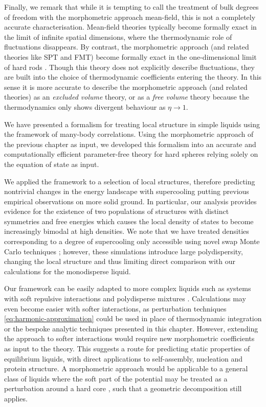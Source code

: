 \documentclass[11pt,twoside]{report}
\begin{document}
Finally, we remark that while it is tempting to call the treatment of bulk degrees of freedom with the morphometric approach mean-field, this is not a completely accurate characterisation.
Mean-field theories typically become formally exact in the limit of infinite spatial dimensions, where the thermodynamic role of fluctuations disappears.
By contrast, the morphometric approach (and related theories like SPT and FMT) become formally exact in the one-dimensional limit of hard rods%
.
Though this theory does not explicitly describe fluctuations, they are built into the choice of thermodynamic coefficients entering the theory.
In this sense it is more accurate to describe the morphometric approach (and related theories) as an \emph{excluded volume} theory, or as a \emph{free volume} theory because the thermodynamics only shows divergent behaviour as $\eta \to 1$.

We have presented a formalism for treating local structure in simple liquids using the framework of many-body correlations.
Using the morphometric approach of the previous chapter as input, we developed this formalism into an accurate and computationally efficient parameter-free theory for hard spheres relying solely on the equation of state as input.

We applied the framework to a selection of local structures, therefore predicting nontrivial changes in the energy landscape with supercooling putting previous empirical observations on more solid ground.
In particular, our analysis provides evidence for the existence of two populations of structures with distinct symmetries and free energies which causes the local density of states to become increasingly bimodal at high densities.
We note that we have treated densities corresponding to a degree of supercooling only accessible using novel swap Monte Carlo techniques \cite{BerthierPRL2016}; however, these simulations introduce large polydispersity, changing the local structure \cite{CoslovichJPCM2018} and thus limiting direct comparison with our calculations for the monodisperse liquid.

Our framework can be easily adapted to more complex liquids such as systems with soft repulsive interactions and polydisperse mixtures \cite{KodamaJCP2011}.
Calculations may even become easier with softer interactions, as perturbation techniques \eqref{eq:harmonic-approximation} could be used in place of thermodynamic integration or the bespoke analytic techniques presented in this chapter.
However, extending the approach to softer interactions would require new morphometric coefficients as input to the theory.
This suggests a route for predicting static properties of equilibrium liquids, with direct applications to self-assembly, nucleation and protein structure.
A morphometric approach would be applicable to a general class of liquids where the soft part of the potential may be treated as a perturbation around a hard core \cite{Hansen2013}, such that a geometric decomposition still applies.
\end{document}
